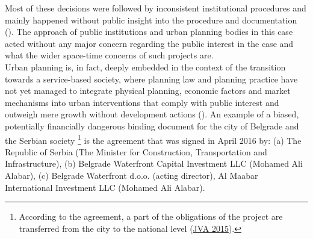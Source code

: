 \documentclass[11pt]{report}
\begin{document}
{{{{Most of these decisions were followed by inconsistent institutional procedures and mainly happened without public insight into the procedure and documentation (\href{Izvestaj}{\citealt{pravni_skener_alternativni_2016}}).
The approach of public institutions and urban planning bodies in this case acted without any major concern regarding the public interest in the case and what the wider space-time concerns of such projects are.
\\

Urban planning is, in fact, deeply embedded in the context of the transition towards a service-based society, where planning law and planning practice have not yet managed to integrate physical planning, economic factors and market mechanisms into urban interventions that comply with public interest and outweigh mere growth without development actions  (\href{Vujosevic}{\citealt{vujosevic_collapse_2010}}).
An example of a biased, potentially financially dangerous binding document for the city of Belgrade and the Serbian society
\footnote{
According to the agreement, a part of the obligations of the project are transferred from the city to the national level (\href{ref}{JVA 2015}).}
is the agreement that was signed in April 2016 by:
(a) The Republic of Serbia (The Minister for Construction, Transportation and Infrastructure),
(b) Belgrade Waterfront Capital Investment LLC (Mohamed Ali Alabar),
(c) Belgrade Waterfront d.o.o. (acting director),
Al Maabar International Investment LLC (Mohamed Ali Alabar).
\\

}}}}
\end{document}
